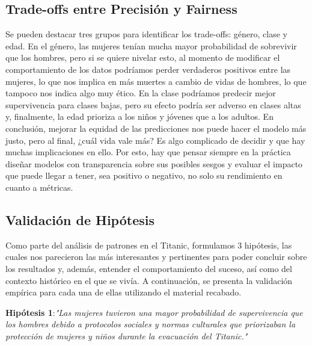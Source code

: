 \documentclass[conference]{IEEEtran}
\begin{document}
\subsection{Trade-offs entre Precisión y Fairness}

Se pueden destacar tres grupos para identificar los trade-offs: género, clase y edad.
En el género, las mujeres tenían mucha mayor probabilidad de sobrevivir que los hombres, pero si se quiere nivelar esto, al momento de modificar el comportamiento de los datos podríamos perder verdaderos positivos entre las mujeres, lo que nos implica en más muertes a cambio de vidas de hombres, lo que tampoco nos indica algo muy ético. En la clase podríamos predecir mejor supervivencia para clases bajas, pero su efecto podría ser adverso en clases altas y, finalmente, la edad prioriza a los niños y jóvenes que a los adultos. En conclusión, mejorar la equidad de las predicciones nos puede hacer el modelo más justo, pero al final, ¿cuál vida vale más? Es algo complicado de decidir y que hay muchas implicaciones en ello. Por esto, hay que pensar siempre en la práctica diseñar modelos con transparencia sobre sus posibles sesgos y evaluar el impacto que puede llegar a tener, sea positivo o negativo, no solo su rendimiento en cuanto a métricas.

\subsection{Validación de Hipótesis}

Como parte del análisis de patrones en el Titanic, formulamos 3 hipótesis, las cuales nos parecieron las más interesantes y pertinentes para poder concluir sobre los resultados y, además, entender el comportamiento del suceso, así como del contexto histórico en el que se vivía. A continuación, se presenta la validación empírica para cada una de ellas utilizando el material recabado.

\vspace{.2 cm}

\textbf{Hipótesis 1}:\textit{"Las mujeres tuvieron una mayor probabilidad de supervivencia que los hombres debido a protocolos sociales y normas culturales que priorizaban la protección de mujeres y niños durante la evacuación del Titanic."}
\end{document}
